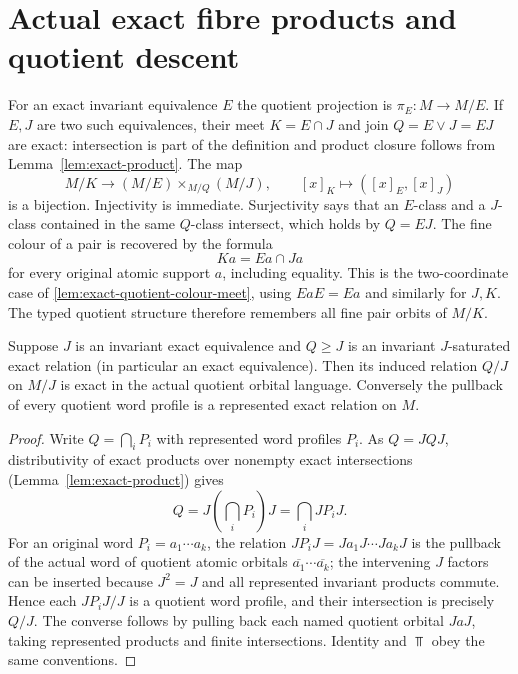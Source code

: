 \section{Actual exact fibre products and quotient descent}
For an exact invariant equivalence $E$ the quotient projection is
$\pi_E:M\to M/E$. If $E,J$ are two such equivalences, their meet
$K=E\cap J$ and join $Q=E\vee J=EJ$ are exact: intersection is part of
the definition and product closure follows from
Lemma~\ref{lem:exact-product}. The map
\begin{equation}\label{eq:fibreproduct}
 M/K\longrightarrow (M/E)\times_{M/Q}(M/J),\qquad
 [x]_K\longmapsto([x]_E,[x]_J)
\end{equation}
is a bijection. Injectivity is immediate. Surjectivity says that
an $E$-class and a $J$-class contained in the same $Q$-class
intersect, which holds by $Q=EJ$. The fine colour of a pair
is recovered by the formula
\begin{equation}\label{eq:colour-meet}
 Ka=Ea\cap Ja
\end{equation}
for every original atomic support $a$, including equality.
This is the two-coordinate case of
\cref{lem:exact-quotient-colour-meet}, using $EaE=Ea$ and similarly
for $J,K$.
The typed quotient structure therefore remembers all fine pair
orbits of $M/K$.

\begin{lemma}
\label{lem:exact-descent}
Suppose $J$ is an invariant exact equivalence and $Q\ge J$ is
an invariant $J$-saturated exact relation (in particular an exact
equivalence). Then its induced relation $Q/J$ on $M/J$ is exact in
the actual quotient orbital language. Conversely the pullback of
every quotient word profile is a represented exact relation on $M$.
\end{lemma}
\begin{proof}
Write $Q=\bigcap_iP_i$ with represented word profiles $P_i$.
As $Q=JQJ$, distributivity of exact products over nonempty exact
intersections (Lemma~\ref{lem:exact-product}) gives
\[
 Q=J\left(\bigcap_iP_i\right)J
  =\bigcap_iJP_iJ.
\]
For an original word $P_i=a_1\cdots a_k$, the relation
$JP_iJ=Ja_1J\cdots Ja_kJ$ is the pullback of the actual word
of quotient atomic orbitals $\overline{a_1}\cdots\overline{a_k}$;
the intervening $J$ factors can be inserted because $J^2=J$
and all represented invariant products commute. Hence each
$JP_iJ/J$ is a quotient word profile, and their intersection is
precisely $Q/J$. The converse follows by pulling back each named
quotient orbital $JaJ$, taking represented products and finite
intersections. Identity and $\Top$ obey the same conventions.
\end{proof}


